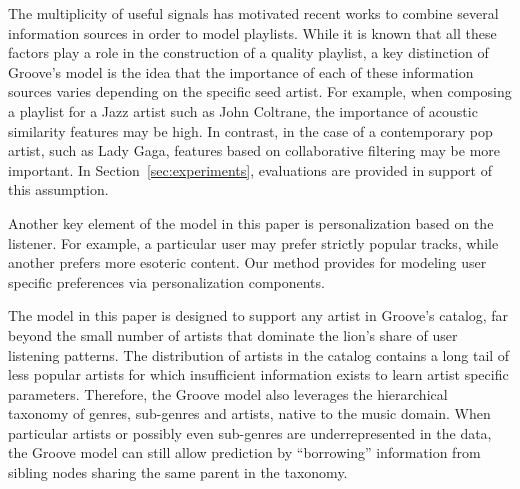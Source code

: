 The multiplicity of useful signals has motivated recent works  \cite{personalized_playlist_schedl,McFee_multi_similarities} to combine several information sources in order to model playlists. %
While it is known that all these factors play a role in the construction of a quality playlist, a key distinction of Groove's model is the idea that the importance of each of these information sources varies depending on the specific seed artist. For example, when composing a playlist for a Jazz artist such as John Coltrane, the importance of acoustic similarity features may be high. In contrast, in the case of a contemporary pop artist, such as Lady Gaga, features based on collaborative filtering may be more important. In Section~\ref{sec:experiments}, evaluations are provided in support of this assumption.
 
Another key element of the model in this paper is personalization based on the listener. For example, a particular user may prefer strictly popular tracks, while another prefers more esoteric content. %
Our method provides for modeling user specific preferences via personalization components.



The model in this paper is designed to support any artist in Groove's catalog, far beyond the small number of artists that dominate the lion's share of user listening patterns. The distribution of artists in the catalog contains a long tail of less popular artists for which insufficient information exists to learn artist specific parameters. Therefore, the Groove model also leverages the hierarchical taxonomy of genres, sub-genres and artists, native to the music domain. %
When particular artists or possibly even sub-genres are underrepresented in the data, the Groove model can still allow prediction by ``borrowing'' information from sibling nodes sharing the same parent in the taxonomy. %

